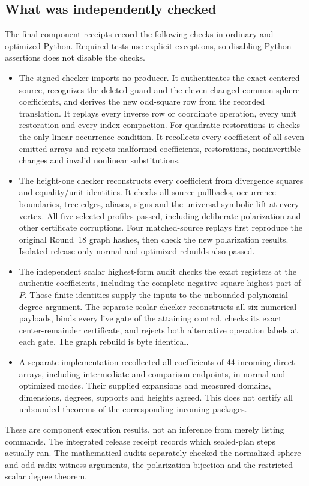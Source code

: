 \subsection{What was independently checked}
The final component receipts record the following checks in ordinary and
optimized Python. Required tests use explicit exceptions, so disabling
Python assertions does not disable the checks.
\begin{itemize}
\item The signed checker imports no producer. It authenticates the exact
centered source, recognizes the deleted guard and the eleven changed
common-sphere coefficients, and derives the new odd-square row from the
recorded translation. It replays every inverse row or coordinate operation,
every unit restoration and every index compaction. For quadratic restorations
it checks the only-linear-occurrence condition. It recollects every coefficient
of all seven emitted arrays and rejects malformed coefficients, restorations,
noninvertible changes and invalid nonlinear substitutions.
\item The height-one checker reconstructs every coefficient from divergence
squares and equality/unit identities. It checks all source pullbacks,
occurrence boundaries, tree edges, aliases, signs and the universal symbolic
lift at every vertex. All five selected profiles passed, including deliberate
polarization and other certificate corruptions. Four matched-source replays
first reproduce the original Round~18 graph hashes, then check the new
polarization results. Isolated release-only normal and optimized rebuilds
also passed.
\item The independent scalar highest-form audit checks the exact registers
at the authentic coefficients, including the complete negative-square highest
part of $P$. Those finite identities supply the inputs to the unbounded
polynomial degree argument. The separate scalar checker reconstructs all six numerical payloads,
binds every live gate of the attaining control, checks its exact
center-remainder certificate, and rejects both alternative operation labels
at each gate. The graph rebuild is byte identical.
\item A separate implementation recollected all coefficients of 44 incoming
direct arrays, including intermediate and comparison endpoints, in normal
and optimized modes. Their supplied expansions and measured domains,
dimensions, degrees, supports and heights agreed. This does not certify
all unbounded theorems of the corresponding incoming packages.
\end{itemize}
These are component execution results, not an inference from merely listing
commands. The integrated release receipt records which sealed-plan steps
actually ran. The mathematical audits separately checked the normalized
sphere and odd-radix witness arguments, the polarization bijection and the
restricted scalar degree theorem.

